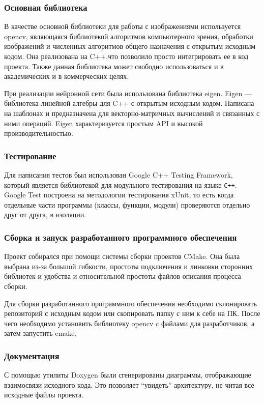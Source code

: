 \documentclass[a4paper,12pt]{report}
\numberwithin{equation}{section}
\begin{document}
\subsubsection{Основная библиотека}
В качестве основной библиотеки для работы с изображениями используется opencv,
являющаяся библиотекой алгоритмов компьютерного зрения, обработки изображений и
численных алгоритмов общего назначения с открытым исходным кодом. Она
реализована на C++,что позволило просто интегрировать ее в код
проекта. Также данная библиотека может свободно использоваться и в академических
и в коммерческих целях.


При реализации нейронной сети была использована библиотека eigen. Eigen —
библиотека линейной алгебры для C++ с открытым исходным кодом. Написана на
шаблонах и предназначена для векторно-матричных вычислений и связанных с ними
операций. Eigen характеризуется простым API и высокой производительностью.

\subsubsection{Тестирование}
Для написания тестов был использован Google C++ Testing Framework, который
является библиотекой для модульного тестирования на языке \verb!C++!. Google
Test построена на методологии тестирования xUnit, то есть когда отдельные части
программы (классы, функции, модули) проверяются отдельно друг от друга, в
изоляции.

\subsubsection{Сборка и запуск разработанного программного обеспечения}
Проект собирался при помощи системы сборки проектов CMake. Она была выбрана
из-за большой гибкости, простоты подключения и линковки сторонних библиотек и
удобства и относительной простоты файлов описания процесса сборки.

Для сборки разработанного программного обеспечения необходимо склонировать
репозиторий с исходным кодом или скопировать папку с ним к себе на ПК. После
чего необходимо установить библиотеку opencv c файлами для разработчиков, а
затем запустить cmake.

\subsubsection{Документация}
С помощью утилиты Doxygen были сгенерированы диаграммы, отображающие
взаимосвязи исходного кода. Это позволяет ``увидеть'' архитектуру,
не читая все исходные файлы проекта.
\end{document}
